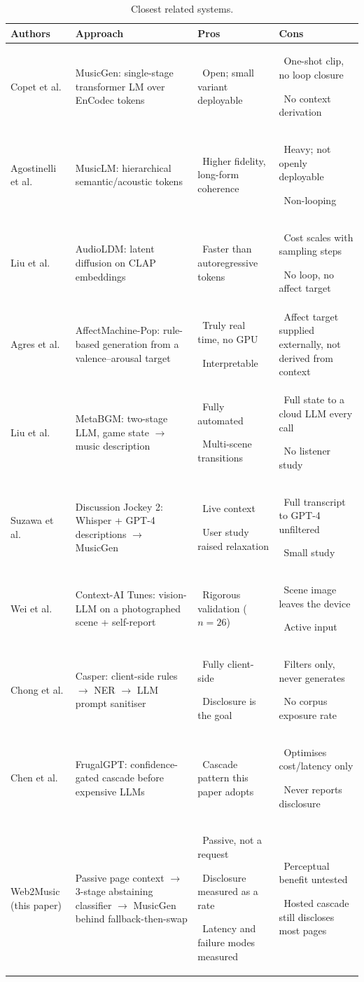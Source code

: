 \documentclass[conference]{IEEEtran}
\newcommand{\bl}[1]{\par{\hangindent=6pt\hangafter=1\noindent\textbullet\ #1}}
\let\IEEEoriginalcaption\caption
\renewcommand{\caption}[1]{\IEEEoriginalcaption{\footnotesize #1}}
\begin{document}
\begin{table}[!t]
\caption{Closest related systems.}
\label{tab:litreview}
\begin{center}
\scriptsize
\setlength{\tabcolsep}{4pt}
\begin{tabular}{p{0.95in}p{1.95in}p{1.6in}p{1.7in}}
\toprule
\textbf{Authors} & \textbf{Approach} & \textbf{Pros} & \textbf{Cons} \\
\midrule
Copet et al. \cite{musicgen} & MusicGen: single-stage transformer LM over EnCodec tokens &
\bl{Open; small variant deployable} &
\bl{One-shot clip, no loop closure}\bl{No context derivation} \\[1.5pt]
Agostinelli et al. \cite{musiclm} & MusicLM: hierarchical semantic/acoustic tokens &
\bl{Higher fidelity, long-form coherence} &
\bl{Heavy; not openly deployable}\bl{Non-looping} \\[1.5pt]
Liu et al. \cite{audioldm} & AudioLDM: latent diffusion on CLAP embeddings &
\bl{Faster than autoregressive tokens} &
\bl{Cost scales with sampling steps}\bl{No loop, no affect target} \\[1.5pt]
Agres et al. \cite{affectmachine} & AffectMachine-Pop: rule-based generation from a valence--arousal target &
\bl{Truly real time, no GPU}\bl{Interpretable} &
\bl{Affect target supplied externally, not derived from context} \\[1.5pt]
Liu et al. \cite{metabgm} & MetaBGM: two-stage LLM, game state $\to$ music description &
\bl{Fully automated}\bl{Multi-scene transitions} &
\bl{Full state to a cloud LLM every call}\bl{No listener study} \\[1.5pt]
Suzawa et al. \cite{discussionjockey} & Discussion Jockey 2: Whisper + GPT-4 descriptions $\to$ MusicGen &
\bl{Live context}\bl{User study raised relaxation} &
\bl{Full transcript to GPT-4 unfiltered}\bl{Small study} \\[1.5pt]
Wei et al. \cite{contextaitunes} & Context-AI Tunes: vision-LLM on a photographed scene + self-report &
\bl{Rigorous validation ($n=26$)} &
\bl{Scene image leaves the device}\bl{Active input} \\[1.5pt]
Chong et al. \cite{casper} & Casper: client-side rules $\to$ NER $\to$ LLM prompt sanitiser &
\bl{Fully client-side}\bl{Disclosure is the goal} &
\bl{Filters only, never generates}\bl{No corpus exposure rate} \\[1.5pt]
Chen et al. \cite{frugalgpt} & FrugalGPT: confidence-gated cascade before expensive LLMs &
\bl{Cascade pattern this paper adopts} &
\bl{Optimises cost/latency only}\bl{Never reports disclosure} \\[1.5pt]
\midrule
Web2Music (this paper) & Passive page context $\to$ 3-stage abstaining classifier $\to$ MusicGen behind fallback-then-swap &
\bl{Passive, not a request}\bl{Disclosure measured as a rate}\bl{Latency and failure modes measured} &
\bl{Perceptual benefit untested}\bl{Hosted cascade still discloses most pages} \\
\bottomrule
\end{tabular}
\end{center}
\end{table}
\end{document}
